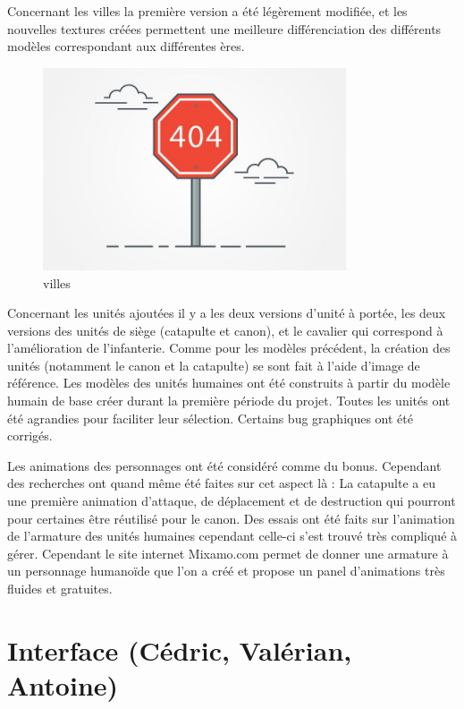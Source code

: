 \documentclass[12pt]{report}
\begin{document}
Concernant les villes la première version a été légèrement modifiée, et les nouvelles textures créées permettent une meilleure différenciation des différents modèles correspondant aux différentes ères.

\begin{figure}[H]
    \centering
    \includegraphics[width=0.8\textwidth]{404}
    \caption{villes}
\end{figure}

Concernant les unités ajoutées il y a les deux versions d’unité à portée, les deux versions des unités de siège (catapulte et canon), et le cavalier qui correspond à l’amélioration de l’infanterie. Comme pour les modèles précédent, la création des unités (notamment le canon et la catapulte) se sont fait à l’aide d’image de référence. Les modèles des unités humaines ont été construits à partir du modèle humain de base créer durant la première période du projet. Toutes les unités ont été agrandies pour faciliter leur sélection. Certains bug graphiques ont été corrigés.

Les animations des personnages ont été considéré comme du bonus. Cependant des recherches ont quand même été faites sur cet aspect là : La catapulte a eu une première animation d’attaque, de déplacement et de destruction qui pourront pour certaines être réutilisé pour le canon. Des essais ont été faits sur l’animation de l’armature des unités humaines cependant celle-ci s’est trouvé très compliqué à gérer. Cependant le site internet Mixamo.com permet de donner une armature à un personnage humanoïde que l’on a créé et propose un panel d’animations très fluides et gratuites.

\section{Interface (Cédric, Valérian, Antoine)}
\end{document}

